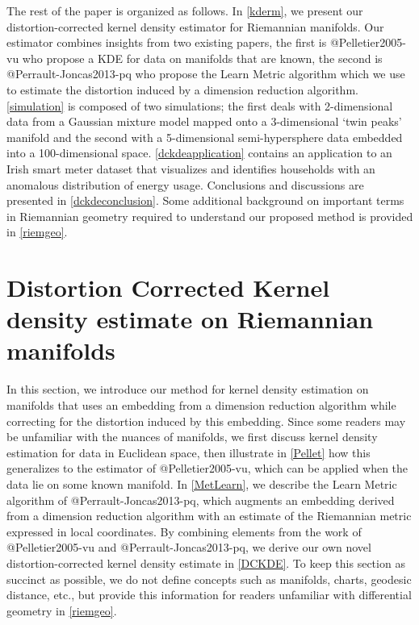 \documentclass[
]{article}
\begin{document}
The rest of the paper is organized as follows. In \autoref{kderm}, we
present our distortion-corrected kernel density estimator for Riemannian
manifolds. Our estimator combines insights from two existing papers, the
first is @Pelletier2005-vu who propose a KDE for data on manifolds that
are known, the second is @Perrault-Joncas2013-pq who propose the Learn
Metric algorithm which we use to estimate the distortion induced by a
dimension reduction algorithm. \autoref{simulation} is composed of two
simulations; the first deals with 2-dimensional data from a Gaussian
mixture model mapped onto a 3-dimensional `twin peaks' manifold and the
second with a 5-dimensional semi-hypersphere data embedded into a
100-dimensional space. \autoref{dckdeapplication} contains an
application to an Irish smart meter dataset that visualizes and
identifies households with an anomalous distribution of energy usage.
Conclusions and discussions are presented in \autoref{dckdeconclusion}.
Some additional background on important terms in Riemannian geometry
required to understand our proposed method is provided in
\autoref{riemgeo}.

\hypertarget{kderm}{%
\section{Distortion Corrected Kernel density estimate on Riemannian
manifolds}\label{kderm}}

In this section, we introduce our method for kernel density estimation
on manifolds that uses an embedding from a dimension reduction algorithm
while correcting for the distortion induced by this embedding. Since
some readers may be unfamiliar with the nuances of manifolds, we first
discuss kernel density estimation for data in Euclidean space, then
illustrate in \autoref{Pellet} how this generalizes to the estimator of
@Pelletier2005-vu, which can be applied when the data lie on some known
manifold. In \autoref{MetLearn}, we describe the Learn Metric algorithm
of @Perrault-Joncas2013-pq, which augments an embedding derived from a
dimension reduction algorithm with an estimate of the Riemannian metric
expressed in local coordinates. By combining elements from the work of
@Pelletier2005-vu and @Perrault-Joncas2013-pq, we derive our own novel
distortion-corrected kernel density estimate in \autoref{DCKDE}. To keep
this section as succinct as possible, we do not define concepts such as
manifolds, charts, geodesic distance, etc., but provide this information
for readers unfamiliar with differential geometry in \autoref{riemgeo}.
\end{document}
